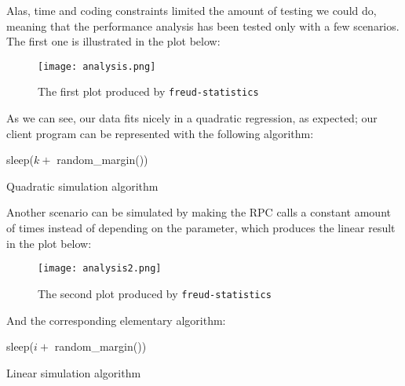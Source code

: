     Alas, time and coding constraints limited the amount of testing we could do,
    meaning that the performance analysis has been tested only with a few scenarios. The first one
    is illustrated in the plot below:\\

    \begin{figure}[H]
        \centering
        \texttt{[image: analysis.png]}
        \caption{The first plot produced by \texttt{freud-statistics}}
        \label{fig:analysis1}
    \end{figure}

    As we can see, our data fits nicely in a quadratic regression, as expected;
    our client program can be represented with the following algorithm:\\

    \begin{algorithm}[H]
         {
             {
                 {
                    sleep($k + $ random\_margin())\;
                }
            }
        }
        \caption{Quadratic simulation algorithm}
    \end{algorithm}

    \vspace{5mm}

    Another scenario can be simulated by making the RPC calls a constant amount of times instead
    of depending on the parameter, which produces the linear result in the plot below:\\

    \begin{figure}[H]
        \centering
        \texttt{[image: analysis2.png]}
        \caption{The second plot produced by \texttt{freud-statistics}}
        \label{fig:analysis2}
    \end{figure}

    And the corresponding elementary algorithm:\\

    \begin{algorithm}[H]
        \SetAlgoLined
         {
             {
                sleep($i + $ random\_margin())\;
            }
        }
        \caption{Linear simulation algorithm}
    \end{algorithm}

    \vspace{5mm}


